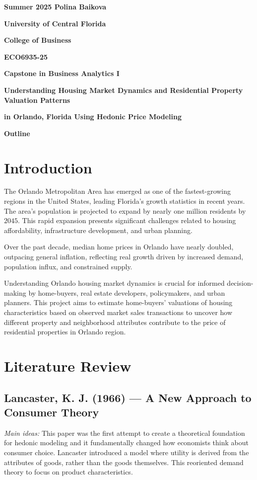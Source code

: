 \documentclass[11pt]{article}
\begin{document}
	
	\pagestyle{empty}
	{\noindent\bf Summer 2025 \hfill Polina Baikova}
	\vskip 16pt
	\centerline{\bf University of Central Florida}
	\centerline{\bf College of Business}
	\vskip 16pt
	\centerline{\bf ECO6935-25}
	\centerline{\bf Capstone in Business Analytics I}
	\vskip 10pt
	\centerline{\bf Understanding Housing Market Dynamics and Residential Property Valuation Patterns }
	\centerline{\bf in Orlando, Florida Using Hedonic Price Modeling}
    \centerline{\bf Outline}    
	\vskip 22pt
	\noindent
	
\renewcommand{\thesection}{\arabic{section}}
\section{Introduction}

The Orlando Metropolitan Area has emerged as one of the fastest-growing regions in the United States, leading Florida’s growth statistics in recent years. The area's population is projected to expand by nearly one million residents by $2045$. This rapid expansion presents significant challenges related to housing affordability, infrastructure development, and urban planning. 

Over the past decade, median home prices in Orlando have nearly doubled, outpacing general inflation, reflecting real growth driven by increased demand, population influx, and constrained supply.

Understanding Orlando housing market dynamics is crucial for informed decision-making by home-buyers, real estate developers, policymakers, and urban planners. This project aims to estimate home-buyers’ valuations of housing characteristics based on observed market sales transactions to uncover how different property and neighborhood attributes contribute to the price of residential properties in Orlando region. 

\section{Literature Review}

\subsection{Lancaster, K. J. (1966) — A New Approach to Consumer Theory}  

\textit{Main ideas:} This paper was the first attempt to create a theoretical foundation for hedonic modeling and it fundamentally changed how economists think about consumer choice. Lancaster introduced a model where utility is derived from the attributes of goods, rather than the goods themselves. This reoriented demand theory to focus on product characteristics. 
\end{document}
